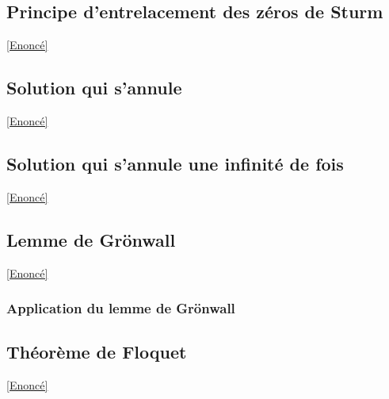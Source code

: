 \documentclass{book}
\begin{document}
	\subsection{Principe d'entrelacement des zéros de Sturm}\label{sec:principe-dentrelacement-des-zeros-de-sturm}
		\textcolor{blue}{\hyperref[Principe d'entrelacement des zéros de Sturm]{[Enoncé]}}\\
	
	\subsection{Solution qui s'annule}\label{sec:solution-qui-sannule}
		\textcolor{blue}{\hyperref[Solution qui s'annule]{[Enoncé]}}\\
	
	\subsection{Solution qui s'annule une infinité de fois}\label{sec:solution-qui-sannule-une-infinite-de-fois}
		\textcolor{blue}{\hyperref[Solution qui s'annule une infinité de fois]{[Enoncé]}}\\
	
	\subsection{Lemme de Grönwall}\label{sec:lemme-de-gronwall}
		\textcolor{blue}{\hyperref[Lemme de Gröwall]{[Enoncé]}}\\
	
	\subsubsection{Application du lemme de Grönwall}
	
	
	\subsection{Théorème de Floquet}\label{sec:theoreme-de-floquet}
		\textcolor{blue}{\hyperref[Théorème de Floquet]{[Enoncé]}}\\
	
\end{document}
